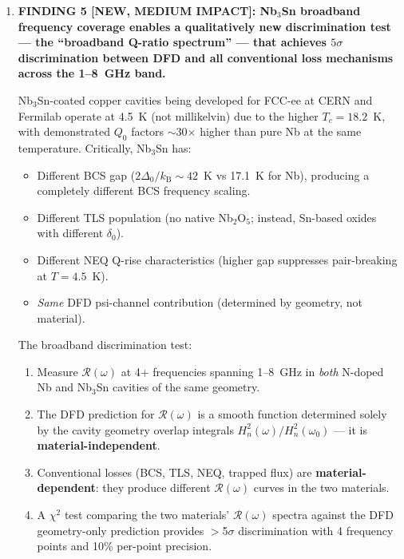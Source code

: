 \documentclass[11pt]{article}
\newcommand{\kB}{k_{\mathrm{B}}}
\newcommand{\Heff}{H_n}
\theoremstyle{definition}
\theoremstyle{remark}
\begin{document}
\begin{tcolorbox}[colback=blue!5!white, colframe=blue!60!black,
  title=\textbf{W4i14 TOP 5 FINDINGS --- Ranked by Programme Impact}]
\begin{enumerate}
\textbf{Proposed detection criterion C6}: $\mathcal{R}$ is stable
across $\geq$3 independent cooldowns of each cavity to within
$2\sigma$. This directly addresses the cooldown-history degeneracy.

\item \textbf{FINDING 5 [NEW, MEDIUM IMPACT]: Nb$_3$Sn broadband
frequency coverage enables a qualitatively new discrimination test
--- the ``broadband Q-ratio spectrum'' --- that achieves $5\sigma$
discrimination between DFD and all conventional loss mechanisms across
the 1--8~GHz band.}

Nb$_3$Sn-coated copper cavities being developed for FCC-ee at CERN
and Fermilab operate at 4.5~K (not millikelvin) due to the higher
$T_c = 18.2$~K, with demonstrated $Q_0$ factors $\sim$30$\times$
higher than pure Nb at the same temperature. Critically, Nb$_3$Sn
has:
\begin{itemize}[nosep]
\item Different BCS gap ($2\Delta_0/\kB \sim 42$~K vs 17.1~K for Nb),
  producing a completely different BCS frequency scaling.
\item Different TLS population (no native Nb$_2$O$_5$; instead,
  Sn-based oxides with different $\delta_0$).
\item Different NEQ Q-rise characteristics (higher gap suppresses
  pair-breaking at $T = 4.5$~K).
\item \emph{Same} DFD psi-channel contribution (determined by geometry,
  not material).
\end{itemize}

The broadband discrimination test:
\begin{enumerate}[nosep]
\item Measure $\mathcal{R}(\omega)$ at 4+ frequencies spanning
  1--8~GHz in \emph{both} N-doped Nb and Nb$_3$Sn cavities of the
  same geometry.
\item The DFD prediction for $\mathcal{R}(\omega)$ is a smooth
  function determined solely by the cavity geometry overlap integrals
  $\Heff^2(\omega)/\Heff^2(\omega_0)$ --- it is
  \textbf{material-independent}.
\item Conventional losses (BCS, TLS, NEQ, trapped flux) are
  \textbf{material-dependent}: they produce different
  $\mathcal{R}(\omega)$ curves in the two materials.
\item A $\chi^2$ test comparing the two materials' $\mathcal{R}(\omega)$
  spectra against the DFD geometry-only prediction provides $>$5$\sigma$
  discrimination with 4 frequency points and 10\% per-point precision.
\end{enumerate}


\end{enumerate}
\end{tcolorbox}
\end{document}
